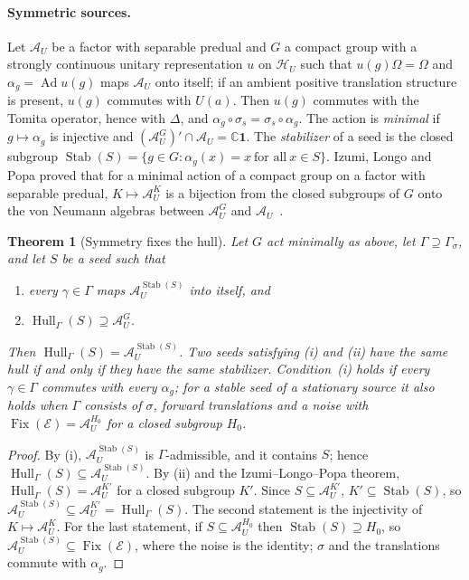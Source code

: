 \documentclass[12pt]{article}
\newtheorem{theorem}{Theorem}[section]
\theoremstyle{definition}
\theoremstyle{remark}
\newcommand{\Fix}{\operatorname{Fix}}
\newcommand{\Hull}{\operatorname{Hull}}
\newcommand{\Stab}{\operatorname{Stab}}
\newcommand{\AU}{\mathcal A_U}
\newcommand{\Ad}{\operatorname{Ad}}
\begin{document}
\paragraph{Symmetric sources.} Let \(\AU\) be a factor with separable predual and \(G\)
a compact group with a strongly continuous unitary representation \(u\) on
\(\mathcal H_U\) such that \(u(g)\Omega=\Omega\) and
\(\alpha_g=\Ad u(g)\) maps \(\AU\) onto itself; if an ambient positive translation structure is present, \(u(g)\)
commutes with \(U(a)\). Then \(u(g)\) commutes with the Tomita operator, hence with
\(\Delta\), and \(\alpha_g\circ\sigma_s=\sigma_s\circ\alpha_g\). The action is
\emph{minimal} if \(g\mapsto\alpha_g\) is injective and \((\AU^G)'\cap\AU=\mathbb C\mathbf 1\). The \emph{stabilizer} of a seed
is the closed subgroup
\(\Stab(S)=\{g\in G:\alpha_g(x)=x\ \text{for all}\ x\in S\}\).
Izumi, Longo and Popa proved that for a minimal action of a compact group on a factor
with separable predual, \(K\mapsto\AU^K\) is a bijection from the closed subgroups of
\(G\) onto the von Neumann algebras between \(\AU^G\) and \(\AU\)~\cite{ILP1998}.

\begin{theorem}[Symmetry fixes the hull]\label{thm:galois}
Let \(G\) act minimally as above, let \(\Gamma\supseteq\Gamma_\sigma\), and let \(S\)
be a seed such that
\begin{enumerate}[label=(\roman*),leftmargin=2em]
\item every \(\gamma\in\Gamma\) maps \(\AU^{\Stab(S)}\) into itself, and
\item \(\Hull_\Gamma(S)\supseteq\AU^G\).
\end{enumerate}
Then \(\Hull_\Gamma(S)=\AU^{\Stab(S)}\). Two seeds satisfying (i) and (ii) have the same
hull if and only if they have the same stabilizer. Condition~(i) holds if every
\(\gamma\in\Gamma\) commutes with every \(\alpha_g\); for a stable seed of a stationary
source it also holds when \(\Gamma\) consists of \(\sigma\), forward translations and a
noise with \(\Fix(\mathcal E)=\AU^{H_0}\) for a closed subgroup \(H_0\).
\end{theorem}

\begin{proof}
By (i), \(\AU^{\Stab(S)}\) is \(\Gamma\)-admissible, and it contains \(S\); hence
\(\Hull_\Gamma(S)\subseteq\AU^{\Stab(S)}\). By (ii) and the Izumi--Longo--Popa theorem,
\(\Hull_\Gamma(S)=\AU^{K'}\) for a closed subgroup \(K'\). Since
\(S\subseteq\AU^{K'}\), \(K'\subseteq\Stab(S)\), so
\(\AU^{\Stab(S)}\subseteq\AU^{K'}=\Hull_\Gamma(S)\). The second statement is the
injectivity of \(K\mapsto\AU^K\). For the last statement, if \(S\subseteq\AU^{H_0}\)
then \(\Stab(S)\supseteq H_0\), so \(\AU^{\Stab(S)}\subseteq\Fix(\mathcal E)\), where the
noise is the identity; \(\sigma\) and the translations commute with \(\alpha_g\).
\end{proof}
\end{document}

